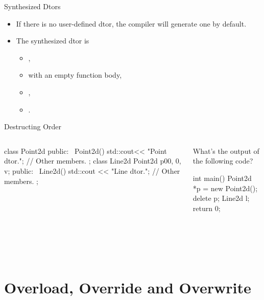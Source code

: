 \documentclass{beamer}
\begin{document}
\begin{frame}{Synthesized Dtors}
    \begin{itemize}
        \item If there is no user-defined dtor, the compiler will generate one by default.
        \item The synthesized dtor is
        \begin{itemize}
            \item {},
            \item with an empty function body,
            \item {},
            \item {}.
        \end{itemize}
    \end{itemize}
\end{frame}

\begin{frame}[fragile]{Destructing Order}
    \begin{columns}
        \begin{column}{0.5\linewidth}
            \begin{cpp}
class Point2d {
 public:
  ~Point2d() {
    std::cout<< "Point dtor.\n";
  }
  // Other members.
};
class Line2d {
  Point2d p0{0, 0}, v; 
 public:
  ~Line2d() {
    std::cout << "Line dtor.\n";
  }
  // Other members.
};
            \end{cpp}
        \end{column}
        \begin{column}{0.5\linewidth}
            What's the output of the following code?
            \begin{cpp}
int main() {
  Point2d *p = new Point2d();
  delete p;
  Line2d l;
  return 0;
}
            \end{cpp}
            \pause
            \\
            \\
            \\
        \end{column}
    \end{columns}
\end{frame}

\section{Overload, Override and Overwrite}
\end{document}
